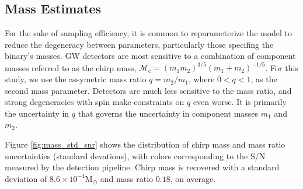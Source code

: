 \subsection{Mass Estimates}

For the sake of sampling efficiency, it is common to reparameterize the model to reduce the degeneracy between parameters, particularly those specifing the binary's masses.  GW detectors are most sensitive to a combination of component masses referred to as the chirp mass, $\mathcal{M}_\mathrm{c} = (m_1 m_2)^{3/5} (m_1 + m_2)^{-1/5}$.  For this study, we use the assymetric mass ratio $q = m_2/m_1$, where $0 < q < 1$, as the second mass parameter.  Detectors are much less sensitive to the mass ratio, and strong degeneracies with spin make constraints on $q$ even worse.  It is primarily the uncertainty in $q$ that governs the uncertainty in component masses $m_1$ and $m_2$.

Figure \ref{fig:mass_std_snr} shows the distribution of chirp mass and mass ratio uncertainties (standard devations), with colors corresponding to the S/N measured by the detection pipeline.  Chirp mass is recovered with a standard deviation of $8.6 \times 10^{-4} \mathrm{M}_\odot$ and mass ratio $0.18$, on average.